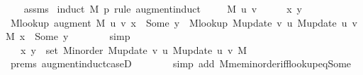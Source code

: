 \begin{isabellebody}
\endisataginvisible
{\isafoldinvisible}%
%
\isadeliminvisible
\isanewline
%
\endisadeliminvisible
%
\isadelimproof
\ \ %
\endisadelimproof
%
\isatagproof
{}\isamarkupfalse%
\ assms\isanewline
{}\isamarkupfalse%
\ {\isacharparenleft}{\kern0pt}induct\ M\ p\ rule{\isacharcolon}{\kern0pt}\ augment{\isachardot}{\kern0pt}induct{\isacharparenright}{\kern0pt}\isanewline
\ \ \isamarkupfalse%
\ {\isacharparenleft}{\kern0pt}{}\ M\ u\ v{\isacharparenright}{\kern0pt}\isanewline
\ \ \isacommand{{\isacharbraceleft}{\kern0pt}}\isamarkupfalse%
\ \isamarkupfalse%
\ x\ y\isanewline
\ \ \ \ \isamarkupfalse%
\ {\isachardoublequoteopen}M{\isacharunderscore}{\kern0pt}lookup\ {\isacharparenleft}{\kern0pt}augment\ M\ {\isacharbrackleft}{\kern0pt}u{\isacharcomma}{\kern0pt}\ v{\isacharbrackright}{\kern0pt}{\isacharparenright}{\kern0pt}\ x\ {\isacharequal}{\kern0pt}\ Some\ y\ {\isasymlongleftrightarrow}\ M{\isacharunderscore}{\kern0pt}lookup\ {\isacharparenleft}{\kern0pt}M{\isacharunderscore}{\kern0pt}update\ v\ u\ {\isacharparenleft}{\kern0pt}M{\isacharunderscore}{\kern0pt}update\ u\ v\ M{\isacharparenright}{\kern0pt}{\isacharparenright}{\kern0pt}\ x\ {\isacharequal}{\kern0pt}\ Some\ y{\isachardoublequoteclose}\isanewline
\ \ \ \ \ \ \isamarkupfalse%
\ simp\isanewline
\ \ \ \ \isamarkupfalse%
\ \isamarkupfalse%
\ {\isachardoublequoteopen}{\isachardot}{\kern0pt}{\isachardot}{\kern0pt}{\isachardot}{\kern0pt}\ {\isasymlongleftrightarrow}\ {\isacharparenleft}{\kern0pt}x{\isacharcomma}{\kern0pt}\ y{\isacharparenright}{\kern0pt}\ {\isasymin}\ set\ {\isacharparenleft}{\kern0pt}M{\isacharunderscore}{\kern0pt}inorder\ {\isacharparenleft}{\kern0pt}M{\isacharunderscore}{\kern0pt}update\ v\ u\ {\isacharparenleft}{\kern0pt}M{\isacharunderscore}{\kern0pt}update\ u\ v\ M{\isacharparenright}{\kern0pt}{\isacharparenright}{\kern0pt}{\isacharparenright}{\kern0pt}{\isachardoublequoteclose}\isanewline
\ \ \ \ \ \ \isamarkupfalse%
\ {\isachardoublequoteopen}{}{\isachardot}{\kern0pt}prems{\isachardoublequoteclose}\ augment{\isacharunderscore}{\kern0pt}induct{\isacharunderscore}{\kern0pt}case{\isacharunderscore}{\kern0pt}{}D{\isacharparenleft}{\kern0pt}{}{\isacharparenright}{\kern0pt}\isanewline
\ \ \ \ \ \ \isamarkupfalse%
\ {\isacharparenleft}{\kern0pt}simp\ add{\isacharcolon}{\kern0pt}\ M{\isachardot}{\kern0pt}mem{\isacharunderscore}{\kern0pt}inorder{\isacharunderscore}{\kern0pt}iff{\isacharunderscore}{\kern0pt}lookup{\isacharunderscore}{\kern0pt}eq{\isacharunderscore}{\kern0pt}Some{\isacharparenright}{\kern0pt}\isanewline

\end{isabellebody}
